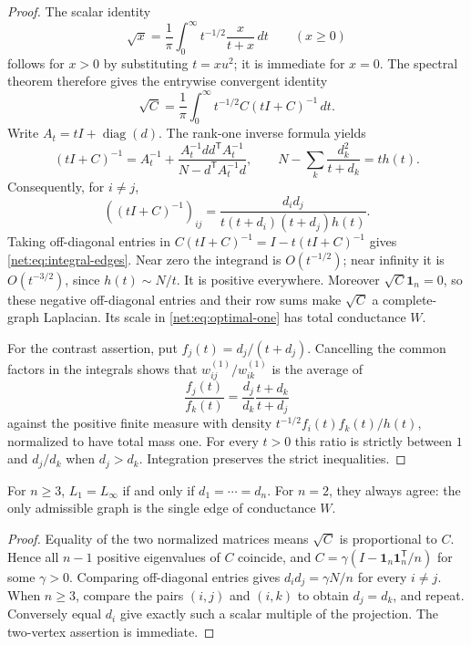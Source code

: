 \begin{proof}
The scalar identity
\[
 \sqrt x=\frac1\pi\int_0^\infty
 t^{-1/2}\frac{x}{t+x}\,dt\qquad(x\ge0)
\]
follows for $x>0$ by substituting $t=xu^2$; it is immediate for $x=0$.
The spectral theorem therefore gives the entrywise convergent identity
\begin{equation}\label{net:eq:sqrt-resolvent}
 \sqrt C=\frac1\pi\int_0^\infty t^{-1/2}C(tI+C)^{-1}\,dt.
\end{equation}
Write $A_t=tI+\operatorname{diag}(d)$. The rank-one inverse formula yields
\[
 (tI+C)^{-1}
 =A_t^{-1}
 +\frac{A_t^{-1}dd^{\mathsf T}A_t^{-1}}
        {N-d^{\mathsf T}A_t^{-1}d},\qquad
 N-\sum_k\frac{d_k^2}{t+d_k}=t h(t).
\]
Consequently, for $i\ne j$,
\[
 ((tI+C)^{-1})_{ij}
 =\frac{d_i d_j}{t(t+d_i)(t+d_j)h(t)}.
\]
Taking off-diagonal entries in
$C(tI+C)^{-1}=I-t(tI+C)^{-1}$ gives
\eqref{net:eq:integral-edges}. Near zero the integrand is
$O(t^{-1/2})$; near infinity it is $O(t^{-3/2})$, since
$h(t)\sim N/t$. It is positive everywhere. Moreover
$\sqrt C\mathbf1_n=0$, so these negative off-diagonal entries and their
row sums make $\sqrt C$ a complete-graph Laplacian. Its scale in
\eqref{net:eq:optimal-one} has total conductance $W$.

For the contrast assertion, put
$f_j(t)=d_j/(t+d_j)$. Cancelling the common factors in the integrals
shows that $w^{(1)}_{ij}/w^{(1)}_{ik}$ is the average of
\[
 \frac{f_j(t)}{f_k(t)}
 =\frac{d_j}{d_k}\frac{t+d_k}{t+d_j}
\]
against the positive finite measure with density
$t^{-1/2}f_i(t)f_k(t)/h(t)$, normalized to have total mass one.
For every $t>0$ this ratio is strictly between $1$ and $d_j/d_k$ when
$d_j>d_k$. Integration preserves the strict inequalities.
\end{proof}

\begin{corollary}\label{net:cor:agreement}
For $n\ge3$, $L_1=L_{\infty}$ if and only if
$d_1=\cdots=d_n$. For $n=2$, they always agree: the only admissible graph
is the single edge of conductance $W$.
\end{corollary}

\begin{proof}
Equality of the two normalized matrices means $\sqrt C$ is proportional
to $C$. Hence all $n-1$ positive eigenvalues of $C$ coincide, and
$C=\gamma(I-\mathbf1_n\mathbf1_n^{\mathsf T}/n)$ for some $\gamma>0$.
Comparing off-diagonal entries gives $d_i d_j=\gamma N/n$ for every
$i\ne j$. When $n\ge3$, compare the pairs $(i,j)$ and $(i,k)$ to obtain
$d_j=d_k$, and repeat. Conversely equal $d_i$ give exactly such a scalar
multiple of the projection. The two-vertex assertion is immediate.
\end{proof}


